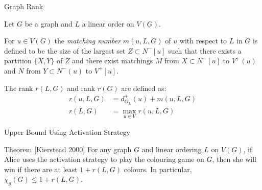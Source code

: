 \documentclass{beamer}
\begin{document}
\begin{frame}{\secname}{Graph Rank}
    
    
    \begin{definition}   
    Let $G$ be a graph and $L$ a linear order on $V(G)$.
    
    For $u \in V(G)$ the \textit{matching number} $m(u, L, G)$ of $u$ with respect to $L$ in $G$ is defined to be the size of the largest set $Z \subset N^-[u]$ such that there exists a partition $\{X, Y\}$ of $Z$ and there exist matchings $M$ from
    $X\subset N^-[u]$ to $V^+(u)$ and $N$ from $Y\subset N^-(u)$ to $V^+[u]$.
    
    The rank $r(L,G)$ and rank $r(G)$ are defined as:
    \begin{align*}
    r(u,L,G) & = d^+_{G_L}(u) + m(u,L,G) \\
    r(L,G)   & = \max_{u \in V}r(u,L,G)  
    \end{align*}
\end{definition}
\end{frame}


\begin{frame}{\secname}{Upper Bound Using Activation Strategy}
    
    \begin{block}{Theorem [Kierstead 2000]}
        For any graph $G$ and linear ordering $L$ on $V(G)$, if Alice uses the activation strategy to play the colouring game on $G$, then she will win if there are at least $1+r(L, G)$ colours. In particular, $\chi_g(G) \leq 1+r(L, G)$.
    \end{block}
\end{frame}

\end{document}
